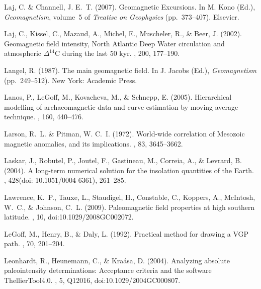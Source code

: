 Laj, C. \& Channell, J. E.~T. (2007).
\newblock Geomagnetic Excursions.
\newblock In M. Kono (Ed.), {\em Geomagnetism}, volume~5 of {\em Treatise on
  Geophysics}  (pp.\ 373--407). Elsevier.

Laj, C., Kissel, C., Mazaud, A., Michel, E., Muscheler, R., \& Beer, J. (2002).
\newblock Geomagnetic field intensity, North Atlantic Deep Water circulation
  and atmospheric $\Delta^{14}$C during the last 50 kyr.
, 200, 177--190.

Langel, R. (1987).
\newblock The main geomagnetic field.
\newblock In J. Jacobs (Ed.), {\em Geomagnetism}  (pp.\ 249--512). New York:
  Academic Press.

Lanos, P., LeGoff, M., Kovacheva, M., \& Schnepp, E. (2005).
\newblock Hierarchical modelling of archaeomagnetic data and curve estimation
  by moving average technique.
, 160, 440--476.

Larson, R.~L. \& Pitman, W. C.~I. (1972).
\newblock World-wide correlation of Mesozoic magnetic anomalies, and its
  implications.
, 83, 3645--3662.

Laskar, J., Robutel, P., Joutel, F., Gastineau, M., Correia, A., \& Levrard, B.
  (2004).
\newblock A long-term numerical solution for the insolation quantities of the
  Earth.
, 428(doi: 10.1051/0004-6361), 261--285.

Lawrence, K.~P., Tauxe, L., Staudigel, H., Constable, C., Koppers, A.,
  McIntosh, W.~C., \& Johnson, C.~L. (2009).
\newblock Paleomagnetic field properties at high southern latitude.
, 10, doi:10.1029/2008GC002072.

LeGoff, M., Henry, B., \& Daly, L. (1992).
\newblock Practical method for drawing a VGP path.
, 70, 201--204.

Leonhardt, R., Heunemann, C., \& Kra\'asa, D. (2004).
\newblock Analyzing absolute paleointensity determinations: Acceptance criteria
  and the software ThellierTool4.0.
, 5, Q12016, doi:10.1029/2004GC000807.

